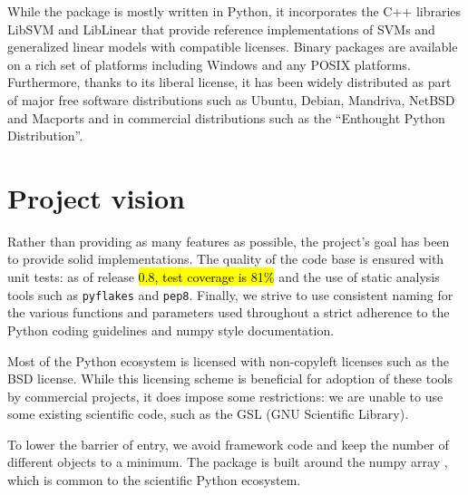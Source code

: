 \documentclass[twoside,11pt]{article}
\begin{document}
While the package is mostly written in Python, it incorporates the C++
libraries LibSVM \citep{chang2001} and LibLinear \citep{fan2008} that
provide reference implementations of SVMs and generalized linear models
with compatible licenses.
%
Binary packages are available on a rich set of platforms including
Windows and any POSIX platforms. Furthermore, thanks to its liberal
license, it has been widely distributed as part
of major free software distributions such as Ubuntu, Debian, Mandriva,
NetBSD and Macports and in commercial distributions such as the ``Enthought
Python Distribution''.




\section {Project vision}

%
Rather than providing as many features as possible, the project's goal has been to provide solid
implementations. The quality of the code base is ensured with unit
tests: as of release \hl{0.8, test coverage is 81\%} and the use of static
analysis tools such as {\tt pyflakes} and {\tt pep8}. Finally, we
strive to use consistent naming for the various functions and
parameters used throughout a strict adherence to the Python coding
guidelines and numpy style documentation.

\smallskip {}
%
Most of the Python ecosystem is licensed with non-copyleft licenses such
as the BSD license. While this licensing scheme is beneficial for adoption
of these tools by commercial
projects, it does impose some restrictions: we are unable to use some existing
scientific code, such as the GSL (GNU Scientific Library).

\smallskip {}
%
To lower the barrier of entry, we avoid framework code and keep the number
of different objects to a minimum.
The package is built
around the numpy array \citep{Vanderwalt2011}, which is common to the
scientific Python ecosystem.
\end{document}
